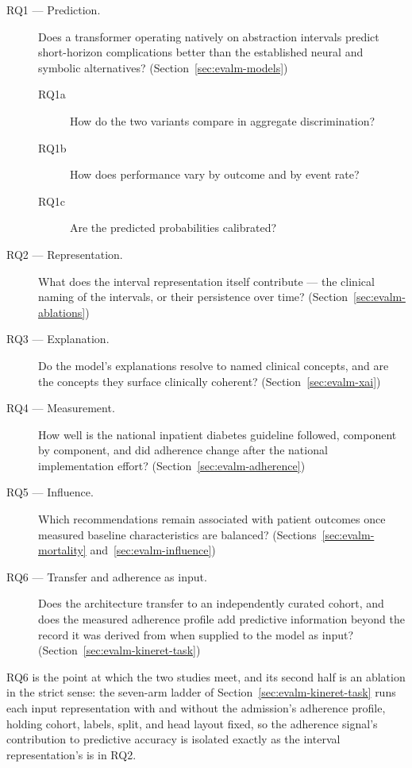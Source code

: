 \begin{description}
  \item[RQ1 --- Prediction.] Does a transformer operating natively on
    abstraction intervals predict short-horizon complications better than the
    established neural and symbolic alternatives?
    (Section~\ref{sec:evalm-models})
    \begin{description}
      \item[RQ1a] How do the two variants compare in aggregate discrimination?
      \item[RQ1b] How does performance vary by outcome and by event rate?
      \item[RQ1c] Are the predicted probabilities calibrated?
    \end{description}
  \item[RQ2 --- Representation.] What does the interval representation itself
    contribute --- the clinical naming of the intervals, or their persistence
    over time? (Section~\ref{sec:evalm-ablations})
  \item[RQ3 --- Explanation.] Do the model's explanations resolve to named
    clinical concepts, and are the concepts they surface clinically coherent?
    (Section~\ref{sec:evalm-xai})
  \item[RQ4 --- Measurement.] How well is the national inpatient diabetes
    guideline followed, component by component, and did adherence change after
    the national implementation effort? (Section~\ref{sec:evalm-adherence})
  \item[RQ5 --- Influence.] Which recommendations remain associated with
    patient outcomes once measured baseline characteristics are balanced?
    (Sections~\ref{sec:evalm-mortality} and~\ref{sec:evalm-influence})
  \item[RQ6 --- Transfer and adherence as input.] Does the architecture
    transfer to an independently curated cohort, and does the measured
    adherence profile add predictive information beyond the record it was
    derived from when supplied to the model as input?
    (Section~\ref{sec:evalm-kineret-task})
\end{description}

RQ6 is the point at which the two studies meet, and its second half is an
ablation in the strict sense: the seven-arm ladder of
Section~\ref{sec:evalm-kineret-task} runs each input representation with and
without the admission's adherence profile, holding cohort, labels, split, and
head layout fixed, so the adherence signal's contribution to predictive
accuracy is isolated exactly as the interval representation's is in RQ2.

